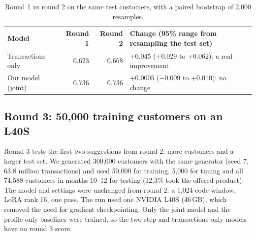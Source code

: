 \documentclass[10pt,a4paper]{article}
\begin{document}
\begin{table}[!htb]
\centering\footnotesize
\begin{tabular}{@{}lrrl@{}}
\toprule
\textbf{Model} & \textbf{Round 1} & \textbf{Round 2} & \textbf{Change (95\% range from resampling the test set)} \\
\midrule
Transactions only & 0.623 & 0.668 & +0.045 (+0.029 to +0.062): a real improvement \\
Our model (joint) & 0.736 & 0.736 & +0.0005 ($-$0.009 to +0.010): no change \\
\bottomrule
\end{tabular}
\caption{Round 1 vs round 2 on the same test customers, with a paired bootstrap of 2,000 resamples.}
\end{table}

\subsection{Round 3: 50,000 training customers on an L40S}
Round 3 tests the first two suggestions from round 2: more customers and a larger test set. We generated 300,000 customers with the same generator (seed 7, 63.8 million transactions) and used 50,000 for training, 5,000 for tuning and all 74,588 customers in months 10--12 for testing (12.3\% took the offered product). The model and settings were unchanged from round 2: a 1,024-code window, LoRA rank 16, one pass. The run used one NVIDIA L40S (46\,GB), which removed the need for gradient checkpointing. Only the joint model and the profile-only baselines were trained, so the two-step and transactions-only models have no round 3 score.
\end{document}
